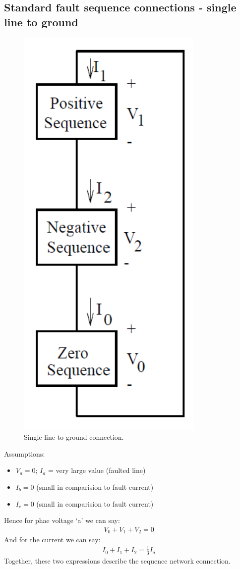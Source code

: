 \subsection{Standard fault sequence connections - single line to ground}
\begin{figure}[H]
	\centering
	\includegraphics[width = 0.3 \textwidth]{./img/figure36.png}
	\caption{Single line to ground connection.}
\end{figure}
Assumptions:
\begin{itemize}
	\item $V_a = 0$; $I_a$ = very large value (faulted line)
	\item $I_b = 0$ (small in comparision to fault current)
	\item $I_c = 0$ (small in comparision to fault current)
\end{itemize}
Hence for phae voltage `a' we can say:
\begin{gather}
	V_0 + V_1 + V_2 = 0
\end{gather}
And for the current we can say:
\begin{gather}
	I_0 + I_1 + I_2 = \frac{1}{3}I_a
\end{gather}
Together, these two expressions describe the sequence network connection.
